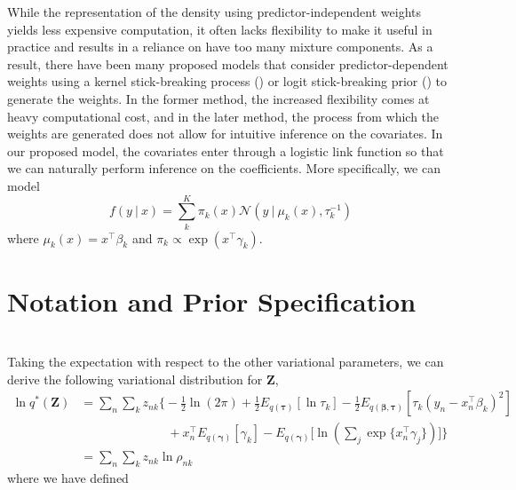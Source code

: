 \documentclass[twoside,11pt]{article}
\newcommand{\tr}{\intercal}
\newcommand\given[1][]{\:#1\vert\:}
\newcommand{\transpose}[1]{#1^{\intercal}}
\begin{document}
While the representation of the density using predictor-independent weights yields less expensive computation, it often lacks flexibility to make it useful in practice and results in a reliance on have too many mixture components. As a result, there have been many proposed models that consider predictor-dependent weights using a kernel stick-breaking process (\cite{dunsonpark:08}) or logit stick-breaking prior (\cite{durante:17}) to generate the weights. In the former method, the increased flexibility comes at heavy computational cost, and in the later method, the process from which the weights are generated does not allow for intuitive inference on the covariates. In our proposed model, the covariates enter through a logistic link function so that we can naturally perform inference on the coefficients. More specifically, we can model
\begin{equation} \label{eq:covdep_gm}
	 f(y \given x) = \sum_{k}^{K} \pi_k(x) \mathcal{N} \left( y \given \mu_k(x), \tau_k^{-1} \right) 
\end{equation} 
where $\mu_k(x) = \transpose{x} \beta_k$ and $\pi_{k} \propto \exp(\transpose{x} \gamma_k)$. 

\section{Notation and Prior Specification}

 






\newpage

\appendix
\section{ } 
\label{app:q_z}

Taking the expectation with respect to the other variational parameters, we can derive the following variational distribution for $\mathbf{Z}$,
\begin{align*}
	\ln q^{*}(\mathbf{Z}) &= \sum_n \sum_k z_{nk} \Bigg\{  -\frac{1}{2}\ln(2\pi) + \frac{1}{2} E_{q(\boldsymbol\tau)}[ \ln \tau_k ] - \frac{1}{2} E_{q(\boldsymbol\beta, \boldsymbol\tau)}[\tau_k (y_n - x_n^{\tr}\beta_k)^2] \\ 
	&\qquad \qquad \qquad \quad + x_n^{\tr}E_{q(\boldsymbol\gamma)}[\gamma_k] - E_{q(\boldsymbol\gamma)}\Bigg[\ln \left( \sum_{j} \exp \{ x_n^{\tr} \gamma_j \}\right)\Bigg]\Bigg\} \\
	&= \sum_n \sum_k z_{nk} \ln \rho_{nk}
\end{align*}
where we have defined 
\end{document}
